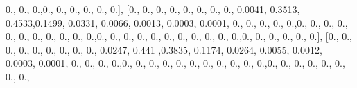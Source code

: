 \documentclass[
]{book}
\newenvironment{Shaded}{\begin{snugshade}}{\end{snugshade}}
\newcommand{\FloatTok}[1]{\textcolor[rgb]{0.00,0.00,0.81}{#1}}
\newcommand{\NormalTok}[1]{#1}
\begin{document}
\begin{Shaded}
\begin{Highlighting}[]
\FloatTok{0.}\NormalTok{, }\FloatTok{0.}\NormalTok{, }\FloatTok{0.}\NormalTok{,}\FloatTok{0.}\NormalTok{, }\FloatTok{0.}\NormalTok{, }\FloatTok{0.}\NormalTok{, }\FloatTok{0.}\NormalTok{, }\FloatTok{0.}\NormalTok{, }\FloatTok{0.}\NormalTok{], [}\FloatTok{0.}\NormalTok{, }\FloatTok{0.}\NormalTok{, }\FloatTok{0.}\NormalTok{, }\FloatTok{0.}\NormalTok{, }\FloatTok{0.}\NormalTok{, }\FloatTok{0.}\NormalTok{, }\FloatTok{0.}\NormalTok{, }\FloatTok{0.}\NormalTok{, }\FloatTok{0.0041}\NormalTok{,}
\FloatTok{0.3513}\NormalTok{, }\FloatTok{0.4533}\NormalTok{,}\FloatTok{0.1499}\NormalTok{, }\FloatTok{0.0331}\NormalTok{, }\FloatTok{0.0066}\NormalTok{, }\FloatTok{0.0013}\NormalTok{, }\FloatTok{0.0003}\NormalTok{, }\FloatTok{0.0001}\NormalTok{, }\FloatTok{0.}\NormalTok{, }\FloatTok{0.}\NormalTok{, }\FloatTok{0.}\NormalTok{, }\FloatTok{0.}\NormalTok{,}
\FloatTok{0.}\NormalTok{,}\FloatTok{0.}\NormalTok{, }\FloatTok{0.}\NormalTok{, }\FloatTok{0.}\NormalTok{, }\FloatTok{0.}\NormalTok{, }\FloatTok{0.}\NormalTok{, }\FloatTok{0.}\NormalTok{, }\FloatTok{0.}\NormalTok{, }\FloatTok{0.}\NormalTok{, }\FloatTok{0.}\NormalTok{, }\FloatTok{0.}\NormalTok{, }\FloatTok{0.}\NormalTok{,}\FloatTok{0.}\NormalTok{, }\FloatTok{0.}\NormalTok{, }\FloatTok{0.}\NormalTok{, }\FloatTok{0.}\NormalTok{, }\FloatTok{0.}\NormalTok{, }\FloatTok{0.}\NormalTok{, }\FloatTok{0.}\NormalTok{, }\FloatTok{0.}\NormalTok{,}
\FloatTok{0.}\NormalTok{, }\FloatTok{0.}\NormalTok{, }\FloatTok{0.}\NormalTok{,}\FloatTok{0.}\NormalTok{, }\FloatTok{0.}\NormalTok{, }\FloatTok{0.}\NormalTok{, }\FloatTok{0.}\NormalTok{, }\FloatTok{0.}\NormalTok{, }\FloatTok{0.}\NormalTok{], [}\FloatTok{0.}\NormalTok{, }\FloatTok{0.}\NormalTok{, }\FloatTok{0.}\NormalTok{, }\FloatTok{0.}\NormalTok{, }\FloatTok{0.}\NormalTok{, }\FloatTok{0.}\NormalTok{, }\FloatTok{0.}\NormalTok{, }\FloatTok{0.}\NormalTok{, }\FloatTok{0.}\NormalTok{, }\FloatTok{0.0247}\NormalTok{,}
\FloatTok{0.441}\NormalTok{ ,}\FloatTok{0.3835}\NormalTok{, }\FloatTok{0.1174}\NormalTok{, }\FloatTok{0.0264}\NormalTok{, }\FloatTok{0.0055}\NormalTok{, }\FloatTok{0.0012}\NormalTok{, }\FloatTok{0.0003}\NormalTok{, }\FloatTok{0.0001}\NormalTok{, }\FloatTok{0.}\NormalTok{, }\FloatTok{0.}\NormalTok{, }\FloatTok{0.}\NormalTok{,}
\FloatTok{0.}\NormalTok{,}\FloatTok{0.}\NormalTok{, }\FloatTok{0.}\NormalTok{, }\FloatTok{0.}\NormalTok{, }\FloatTok{0.}\NormalTok{, }\FloatTok{0.}\NormalTok{, }\FloatTok{0.}\NormalTok{, }\FloatTok{0.}\NormalTok{, }\FloatTok{0.}\NormalTok{, }\FloatTok{0.}\NormalTok{, }\FloatTok{0.}\NormalTok{, }\FloatTok{0.}\NormalTok{,}\FloatTok{0.}\NormalTok{, }\FloatTok{0.}\NormalTok{, }\FloatTok{0.}\NormalTok{, }\FloatTok{0.}\NormalTok{, }\FloatTok{0.}\NormalTok{, }\FloatTok{0.}\NormalTok{, }\FloatTok{0.}\NormalTok{, }\FloatTok{0.}\NormalTok{,}

\end{Highlighting}
\end{Shaded}
\end{document}
